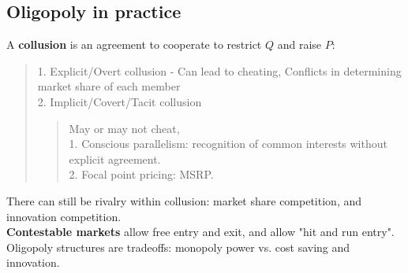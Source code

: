 \subsection{Oligopoly in practice}
A \textbf{collusion} is an agreement to cooperate to restrict $Q$ and raise $P$:
\begin{quote}
    1. Explicit/Overt collusion - Can lead to cheating, Conflicts in determining market share of each member \\
    2. Implicit/Covert/Tacit collusion
    \begin{quote}
        May or may not cheat, \\
        1. Conscious parallelism: recognition of common interests without explicit agreement. \\
        2. Focal point pricing: MSRP.
    \end{quote}
\end{quote}
There can still be rivalry within collusion: market share competition, and 
innovation competition. \\
\textbf{Contestable markets} allow free entry and exit, and allow "hit and run entry". \\
Oligopoly structures are tradeoffs: monopoly power vs. cost saving and innovation.

\newpage
